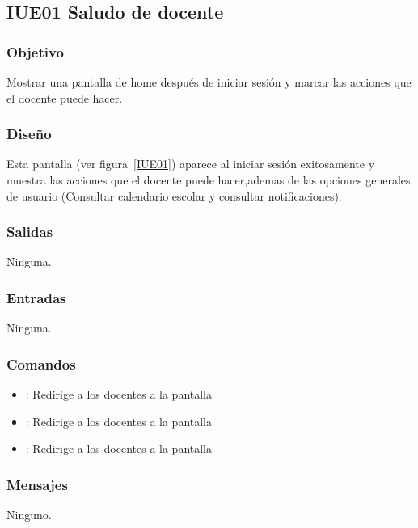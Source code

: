 \subsection{IUE01 Saludo de docente}

\subsubsection{Objetivo}
	Mostrar una pantalla de home después de iniciar sesión y marcar las acciones que el docente puede hacer.

\subsubsection{Diseño}
	Esta pantalla  (ver figura~\ref{IUE01}) aparece al iniciar sesión exitosamente y muestra las acciones que el docente puede hacer,ademas de las opciones generales de usuario (Consultar calendario escolar y consultar notificaciones). 


\subsubsection{Salidas}

	Ninguna.

\subsubsection{Entradas}
	Ninguna.

\subsubsection{Comandos}
\begin{itemize}
	\item {}: Redirige a los docentes a la pantalla 
	\item {}: Redirige a los docentes a la pantalla 
	\item {}: Redirige a los docentes a la pantalla 
	
\end{itemize}

\subsubsection{Mensajes}

\begin{Citemize}
	\item Ninguno.
\end{Citemize}

